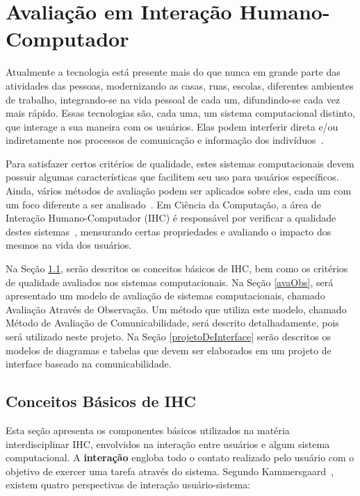 \chapter{Avaliação em Interação Humano-Computador}

\indent Atualmente a tecnologia está presente mais do que nunca em grande parte das atividades das pessoas, modernizando as casas, ruas, escolas, diferentes ambientes de trabalho, integrando-se na vida pessoal de cada um, difundindo-se cada vez mais rápido. Essas tecnologias são, cada uma, um sistema computacional distinto, que interage a sua maneira com os usuários. Elas podem interferir direta e/ou indiretamente nos processos de comunicação e informação dos indivíduos~\cite{tics}. 

\indent Para satisfazer certos critérios de qualidade, estes sistemas computacionais devem possuir algumas características que facilitem seu uso para usuários específicos. Ainda, vários métodos de avaliação podem ser aplicados sobre eles, cada um com um foco diferente a ser analisado~\cite{IHCbook}. Em Ciência da Computação, a área de Interação Humano-Computador (IHC) é responsável por verificar a qualidade destes sistemas~\cite{IHCbook}, mensurando certas propriedades e avaliando o impacto dos mesmos na vida dos usuários. 

\indent Na Seção \ref{cbIHC}, serão descritos os conceitos básicos de IHC, bem como os critérios de qualidade avaliados nos sistemas computacionais. Na Seção \ref{avaObs}, será apresentado um modelo de avaliação de sistemas computacionais, chamado Avaliação Através de Observação. Um método que utiliza este modelo, chamado Método de Avaliação de Comunicabilidade, será descrito detalhadamente, pois será utilizado neste projeto. Na Seção \ref{projetoDeInterface} serão descritos os modelos de diagramas e tabelas que devem ser elaborados em um projeto de interface baseado na comunicabilidade.
 
\section{Conceitos Básicos de IHC} \label{cbIHC}

\indent Esta seção apresenta os componentes básicos utilizados na matéria interdisciplinar IHC, envolvidos na interação entre usuários e algum sistema computacional. A \textbf{interação} engloba todo o contato realizado pelo usuário com o objetivo de exercer uma tarefa através do sistema. Segundo Kammersgaard~\cite{IHCbook}, existem quatro perspectivas de interação usuário-sistema:

